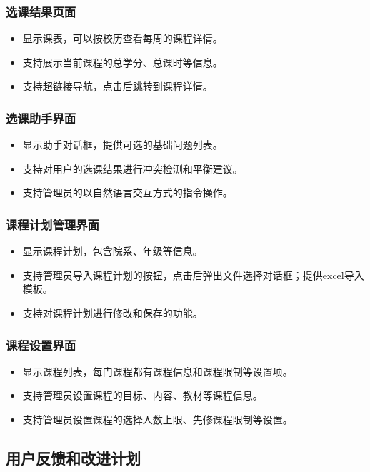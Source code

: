 \documentclass{article}
\begin{document}
\subsubsection{选课结果页面}
\begin{itemize}
	\item 显示课表，可以按校历查看每周的课程详情。
	\item 支持展示当前课程的总学分、总课时等信息。
	\item 支持超链接导航，点击后跳转到课程详情。
\end{itemize}

\subsubsection{选课助手界面}
\begin{itemize}
	\item 显示助手对话框，提供可选的基础问题列表。
	\item 支持对用户的选课结果进行冲突检测和平衡建议。
	\item 支持管理员的以自然语言交互方式的指令操作。
\end{itemize}

\subsubsection{课程计划管理界面}
\begin{itemize}
	\item 显示课程计划，包含院系、年级等信息。
	\item 支持管理员导入课程计划的按钮，点击后弹出文件选择对话框；提供excel导入模板。
	\item 支持对课程计划进行修改和保存的功能。
\end{itemize}

\subsubsection{课程设置界面}
\begin{itemize}
	\item 显示课程列表，每门课程都有课程信息和课程限制等设置项。
	\item 支持管理员设置课程的目标、内容、教材等课程信息。
	\item 支持管理员设置课程的选择人数上限、先修课程限制等设置。
\end{itemize}

\subsection{用户反馈和改进计划}
\end{document}
